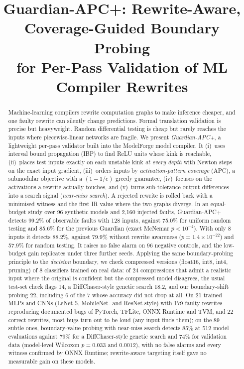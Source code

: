 \documentclass[conference]{IEEEtran}
\begin{document}
\title{Guardian-APC+: Rewrite-Aware, Coverage-Guided Boundary Probing\\for Per-Pass Validation of ML Compiler Rewrites}

\author{
}

\maketitle

\begin{abstract}
Machine-learning compilers rewrite computation graphs to make inference cheaper, and one faulty rewrite can silently change predictions. Formal translation validation is precise but heavyweight. Random differential testing is cheap but rarely reaches the inputs where piecewise-linear networks are fragile. We present \emph{Guardian-APC+}, a lightweight per-pass validator built into the ModelForge model compiler. It (i)~uses interval bound propagation (IBP) to find ReLU units whose kink is reachable, (ii)~places test inputs exactly on each unstable kink \emph{at every depth} with Newton steps on the exact input gradient, (iii)~orders inputs by \emph{activation-pattern coverage} (APC), a submodular objective with a $(1-1/e)$ greedy guarantee, (iv)~focuses on the activations a rewrite actually touches, and (v)~turns sub-tolerance output differences into a search signal (\emph{near-miss search}). A rejected rewrite is rolled back with a minimised witness and the first IR value where the two graphs diverge. In an equal-budget study over 96 synthetic models and 2{,}160 injected faults, Guardian-APC+ detects 99.2\% of observable faults with 128 inputs, against 75.0\% for uniform random testing and 85.6\% for the previous Guardian (exact McNemar $p<10^{-4}$). With only 8 inputs it detects 88.2\%, against 79.9\% without rewrite awareness ($p=1.4\times10^{-22}$) and 57.9\% for random testing. It raises no false alarm on 96 negative controls, and the low-budget gain replicates under three further seeds. Applying the same boundary-probing principle to the \emph{decision} boundary, we check compressed versions (float16, int8, int4, pruning) of 8 classifiers trained on real data: of 24 compressions that admit a realistic input where the original is confident but the compressed model disagrees, the usual test-set check flags 14, a DiffChaser-style genetic search 18.2, and our boundary-shift probing 22, including 6 of the 7 whose accuracy did not drop at all.
 On 21 trained MLPs and CNNs (LeNet-5, MobileNet- and ResNet-style) with 179 faulty rewrites reproducing documented bugs of PyTorch, TFLite, ONNX Runtime and TVM, and 22 correct rewrites, most bugs turn out to be loud (any input finds them); on the 89 subtle ones, boundary-value probing with near-miss search detects 85\% at 512 model evaluations against 79\% for a DiffChaser-style genetic search and 74\% for validation data (model-level Wilcoxon $p=0.033$ and $0.0012$), with no false alarms and every witness confirmed by ONNX Runtime; rewrite-aware targeting itself gave no measurable gain on these models.
\end{abstract}
\end{document}
